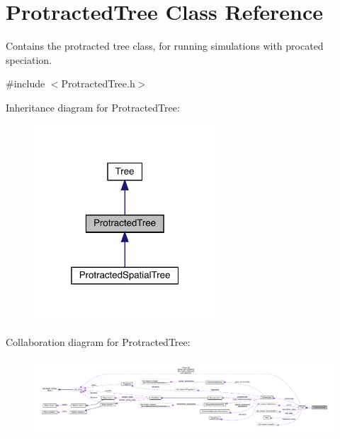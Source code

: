 \hypertarget{class_protracted_tree}{}\section{Protracted\+Tree Class Reference}
\label{class_protracted_tree}


Contains the protracted tree class, for running simulations with procated speciation.  




{\ttfamily \#include $<$Protracted\+Tree.\+h$>$}



Inheritance diagram for Protracted\+Tree\+:
\nopagebreak
\begin{figure}[H]
\begin{center}
\leavevmode
\includegraphics[width=193pt]{class_protracted_tree__inherit__graph}
\end{center}
\end{figure}


Collaboration diagram for Protracted\+Tree\+:
\nopagebreak
\begin{figure}[H]
\begin{center}
\leavevmode
\includegraphics[width=350pt]{class_protracted_tree__coll__graph}
\end{center}
\end{figure}
